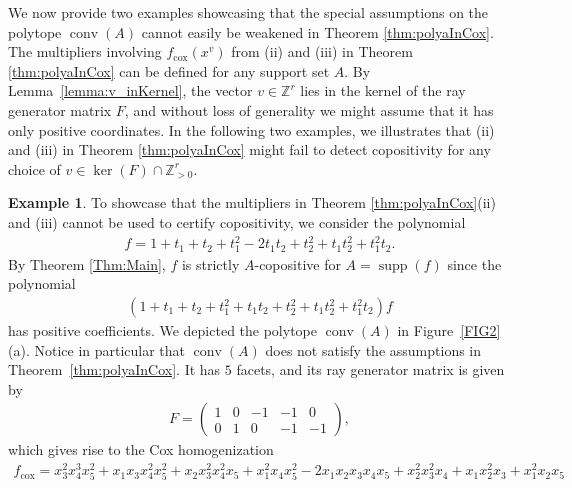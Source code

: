\documentclass[a4paper,11pt]{amsart}
\theoremstyle{definition}
\newtheorem{example}[theorem]{Example}
\DeclareMathOperator{\conv}{conv}
\DeclareMathOperator{\supp}{supp}
\newcommand{\ZZ}{\mathbb{Z}}
\newcommand{\cox}{\mathrm{cox}}
\begin{document}
We now provide two examples showcasing that the special assumptions on the polytope $\conv(A)$ cannot easily be weakened in Theorem \ref{thm:polyaInCox}.
The multipliers involving $f_\cox(x^v)$ from (ii) and (iii) in Theorem \ref{thm:polyaInCox} can be defined for any support set $A$.
  By Lemma~\ref{lemma:v_inKernel}, the vector $v \in \ZZ^r$ lies in the kernel of the ray generator matrix $F$, and without loss of generality we might assume that it has only positive coordinates. 
  In the following two examples, we illustrates that (ii) and (iii) in Theorem \ref{thm:polyaInCox} might fail to detect copositivity for any choice of $v \in \ker(F) \cap \ZZ^{r}_{>0} $.
    
\begin{example}
\label{ex:FirstCounterExample}
    To showcase that the multipliers in Theorem \ref{thm:polyaInCox}(ii) and (iii) cannot be used to certify copositivity, we consider the polynomial \begin{align*}
        f=1+t_1+t_2+t_1^2-2t_1t_2+t_2^2+t_1t_2^2+t_1^2t_2.
    \end{align*}
   By Theorem \ref{Thm:Main}, $f$ is strictly $A$-copositive for $A = \supp(f)$ since the polynomial\begin{align*}
(1+t_1+t_2+t_1^2+t_1t_2+t_2^2+t_1t_2^2+t_1^2t_2)f 
    \end{align*}
    has positive coefficients. We depicted the polytope $\conv(A)$ in Figure~\ref{FIG2}(a). Notice in particular that $\conv(A)$ does not satisfy the assumptions in Theorem~\ref{thm:polyaInCox}. It has $5$ facets, and its ray generator matrix is given by 
\begin{align*}
F = \begin{pmatrix}
    1 & 0 & -1 & -1 & 0 \\
    0 & 1 &  0 & -1 & -1
\end{pmatrix},
\end{align*}
which gives rise to the Cox homogenization
 \begin{align*}
f_\cox=  x_3^2x_4^3x_5^2 + x_1x_3x_4^2x_5^2 + x_2x_3^2x_4^2x_5 + x_1^2x_4x_5^2 -2x_1x_2x_3x_4x_5+x_2^2x_3^2x_4+x_1x_2^2x_3+x_1^2x_2x_5
    \end{align*}


\end{example}
\end{document}
